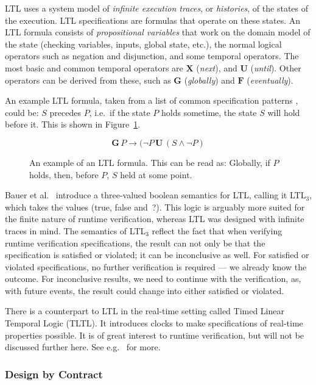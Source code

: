 \documentclass[a4paper,11pt]{kth-mag}
\begin{document}
LTL uses a system model of \textit{infinite execution traces}, or
\textit{histories}, of the states of the execution. LTL specifications are
formulas that operate on these states. An LTL formula consists of
\textit{propositional variables} that work on the domain model of the state
(checking variables, inputs, global state, etc.), the normal logical operators
such as negation and disjunction, and some temporal operators. The most basic
and common temporal operators are $\boldsymbol{X}$ (\textit{next}), and
$\boldsymbol{U}$ (\textit{until}). Other operators can be derived from these,
such as $\boldsymbol{G}$ (\textit{globally}) and $\boldsymbol{F}$
(\textit{eventually}).

An example LTL formula, taken from a list of common specification patterns
\cite{dwyer99patterns}, could be: $S$ precedes $P$, i.e.\ if the state $P$
holds sometime, the state $S$ will hold before it. This is shown in
Figure~\ref{figure-ltl}.

\begin{figure}[h!]
	\[
	\boldsymbol{G} \, P \rightarrow (\neg P \, \boldsymbol{U} \, (S \wedge \neg P)
	\]

	\caption{An example of an LTL formula. This can be read as: Globally, if $P$
	holds, then, before $P$, $S$ held at some point.}
	\label{figure-ltl}
\end{figure}

Bauer et al.\ \cite{bauer06monitoring} introduce a three-valued boolean
semantics for LTL, calling it LTL$_3$, which takes the values (true, false
and~?). This logic is arguably more suited for the finite nature of runtime
verification, whereas LTL was designed with infinite traces in mind. The
semantics of LTL$_3$ reflect the fact that when verifying runtime verification
specifications, the result can not only be that the specification is satisfied
or violated; it can be inconclusive as well. For satisfied or violated
specifications, no further verification is required --- we already know the
outcome. For inconclusive results, we need to continue with the verification,
as, with future events, the result could change into either satisfied or
violated.

There is a counterpart to LTL in the real-time setting called Timed Linear
Temporal Logic (TLTL). It introduces clocks to make specifications
of real-time properties possible. It is of great interest to runtime
verification, but will not be discussed further here. See e.g.\
\cite{bauer06monitoring} for more.


\subsubsection{Design by Contract}
\end{document}
